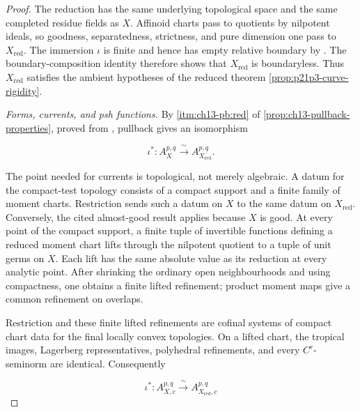 
\begin{proof}
The reduction has the same underlying topological space and the same
completed residue fields as \(X\).  Affinoid charts pass to quotients by
nilpotent ideals, so goodness, separatedness, strictness, and pure
dimension one pass to \(X_{\mathrm{red}}\).  The immersion \(\iota\) is
finite and hence has empty relative boundary by
\cite[\S11.4.4]{CLD25}.  The boundary-composition identity
\cite[(11.4.1.3)]{CLD25} therefore shows that
\(X_{\mathrm{red}}\) is boundaryless.  Thus \(X_{\mathrm{red}}\)
satisfies the ambient hypotheses of the reduced theorem
\cref{prop:p21p3-curve-rigidity}.

\smallskip
\emph{Forms, currents, and psh functions.}
By \cref{itm:ch13-pb:red} of
\cref{prop:ch13-pullback-properties}, proved from
\cite[Proposition~15.1.3(b) and the following form variant]{CLD25},
pullback gives an isomorphism

\begin{equation}
\label{eq:p21p3-nr-form-isomorphism}
       \iota^*:A_X^{p,q}\xrightarrow{\ \sim\ }
                       A_{X_{\mathrm{red}}}^{p,q}.
\end{equation}

The point needed for currents is topological, not merely algebraic.  A
datum for the compact-test topology consists of a compact support and a
finite family of moment charts.  Restriction sends such a datum on \(X\)
to the same datum on \(X_{\mathrm{red}}\).  Conversely, the cited
almost-good result applies because \(X\) is good.  At every point of the
compact support, a finite tuple of invertible functions defining a reduced
moment chart lifts through the nilpotent quotient to a tuple of unit germs
on \(X\).  Each lift has the same absolute value as its reduction at every
analytic point.  After shrinking the ordinary open neighbourhoods and
using compactness, one obtains a finite lifted refinement; product moment
maps give a common refinement on overlaps.

Restriction and these finite lifted refinements are cofinal systems of
compact chart data for the final locally convex topologies.  On a lifted
chart, the tropical images, Lagerberg representatives, polyhedral
refinements, and every \(C^r\)-seminorm are identical.  Consequently

\begin{equation}
\label{eq:p21p3-nr-test-homeomorphism}
 \iota^*:A^{p,q}_{X,c}\xrightarrow{\ \sim\ }
                         A^{p,q}_{X_{\mathrm{red}},c}
\end{equation}


\end{proof}
